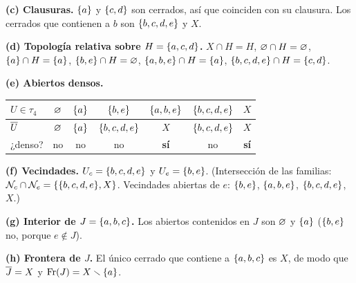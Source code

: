 \textbf{(c) Clausuras.} $\{a\}$ y $\{c,d\}$ son cerrados, así que coinciden con su clausura. Los cerrados que
contienen a $b$ son $\{b,c,d,e\}$ y $X$.

\textbf{(d) Topología relativa sobre $H=\{a,c,d\}$.}
$X\cap H=H$, $\varnothing\cap H=\varnothing$, $\{a\}\cap H=\{a\}$, $\{b,e\}\cap H=\varnothing$, $\{a,b,e\}\cap H=\{a\}$,
$\{b,c,d,e\}\cap H=\{c,d\}$.

\textbf{(e) Abiertos densos.}
\begin{center}\small\renewcommand{\arraystretch}{1.15}
\begin{tabular}{@{}lcccccc@{}}\toprule
$U\in\tau_4$ & $\varnothing$ & $\{a\}$ & $\{b,e\}$ & $\{a,b,e\}$ & $\{b,c,d,e\}$ & $X$\\ \midrule
$\overline{U}$ & $\varnothing$ & $\{a\}$ & $\{b,c,d,e\}$ & $X$ & $\{b,c,d,e\}$ & $X$\\
¿denso? & no & no & no & \textbf{sí} & no & \textbf{sí}\\ \bottomrule
\end{tabular}\end{center}

\textbf{(f) Vecindades.} $U_c=\{b,c,d,e\}$ y $U_e=\{b,e\}$.
(Intersección de las familias: $\mathcal{N}_c\cap\mathcal{N}_e=\{\{b,c,d,e\},X\}$. Vecindades abiertas de $e$: $\{b,e\}$, $\{a,b,e\}$,
$\{b,c,d,e\}$, $X$.)

\textbf{(g) Interior de $J=\{a,b,c\}$.} Los abiertos contenidos en $J$ son $\varnothing$ y $\{a\}$ ($\{b,e\}$ no, porque
$e\notin J$).

\textbf{(h) Frontera de $J$.} El único cerrado que contiene a $\{a,b,c\}$ es $X$, de modo que $\overline{J}=X$ y
$\operatorname{Fr}(J)=X\smallsetminus\{a\}$.
